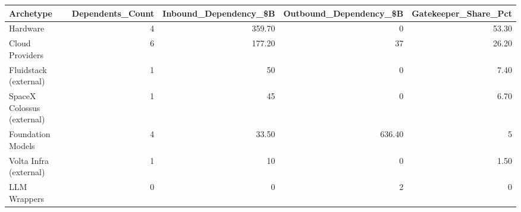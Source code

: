 

\begin{tabular}{@{}lrrrr@{}}
\toprule
Archetype & Dependents\_Count & Inbound\_Dependency\_\$B & Outbound\_Dependency\_\$B & Gatekeeper\_Share\_Pct \\
\midrule
Hardware & 4 & 359.70 & 0 & 53.30 \\
Cloud Providers & 6 & 177.20 & 37 & 26.20 \\
Fluidstack (external) & 1 & 50 & 0 & 7.40 \\
SpaceX Colossus (external) & 1 & 45 & 0 & 6.70 \\
Foundation Models & 4 & 33.50 & 636.40 & 5 \\
Volta Infra (external) & 1 & 10 & 0 & 1.50 \\
LLM Wrappers & 0 & 0 & 2 & 0 \\
\bottomrule
\end{tabular}